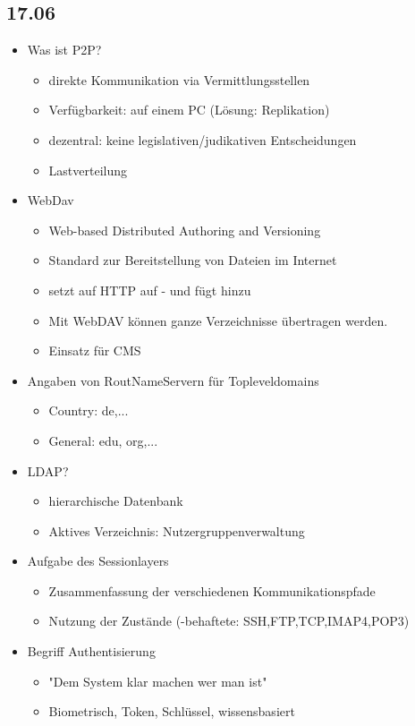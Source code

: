 \documentclass{article} %
\begin{document}
	\subsection{17.06}
	\begin{itemize}
		\item Was ist P2P?
		\begin{itemize}
			\item direkte Kommunikation via Vermittlungsstellen
			\item Verfügbarkeit: auf einem PC (Lösung: Replikation)
			\item dezentral: keine legislativen/judikativen Entscheidungen
			\item Lastverteilung
		\end{itemize}
		\item WebDav
		\begin{itemize}
			\item Web-based Distributed Authoring and Versioning
			\item Standard zur Bereitstellung von Dateien im Internet
			\item setzt auf HTTP auf - und fügt hinzu
			\item Mit WebDAV können ganze Verzeichnisse übertragen werden.
			\item Einsatz für CMS
		\end{itemize}
		\item Angaben von RoutNameServern für Topleveldomains
		\begin{itemize}
			\item Country: de,...
			\item General: edu, org,...
		\end{itemize}
		\item LDAP?
		\begin{itemize}
			\item hierarchische Datenbank
			\item Aktives Verzeichnis: Nutzergruppenverwaltung
		\end{itemize}
		\item Aufgabe des Sessionlayers
		\begin{itemize}
			\item Zusammenfassung der verschiedenen Kommunikationspfade
			\item Nutzung der Zustände (-behaftete: SSH,FTP,TCP,IMAP4,POP3)
		\end{itemize}
		\item Begriff Authentisierung
		\begin{itemize}
			\item "Dem System klar machen wer man ist"
			\item Biometrisch, Token, Schlüssel, wissensbasiert
		\end{itemize}		
	\end{itemize}
\end{document}
